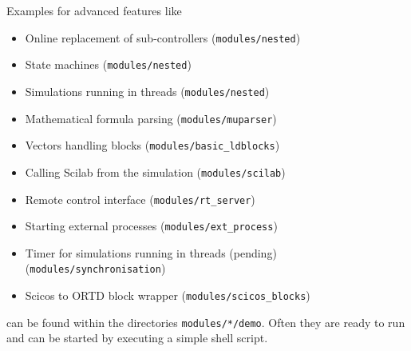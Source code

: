 \documentclass[serif,9pt,xcolor=dvipsnames]{beamer}
\begin{document}
\begin{frame}
Examples for advanced features like 

  \begin{itemize}
\item Online replacement of sub-controllers (\texttt{modules/nested})
\item State machines (\texttt{modules/nested})
\item Simulations running in threads (\texttt{modules/nested})
\item Mathematical formula parsing (\texttt{modules/muparser})
\item Vectors handling blocks (\texttt{modules/basic\_ldblocks})
\item Calling Scilab from the simulation (\texttt{modules/scilab})
\item Remote control interface (\texttt{modules/rt\_server})
\item Starting external processes (\texttt{modules/ext\_process})
\item Timer for simulations running in threads (pending) (\texttt{modules/synchronisation})
\item Scicos to ORTD block wrapper (\texttt{modules/scicos\_blocks})
  \end{itemize}

  can be found within the directories \texttt{modules/*/demo}. Often they are ready to run and can be started by executing a simple shell script.
\end{frame}
\end{document}
